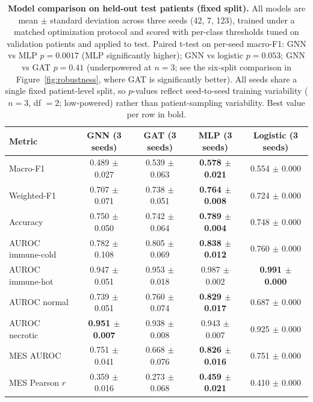 \documentclass[11pt,letterpaper]{article}
\begin{document}
\begin{table}[H]
\centering
\caption{\textbf{Model comparison on held-out test patients (fixed split).} All models are mean $\pm$ standard deviation across three seeds (42, 7, 123), trained under a matched optimization protocol and scored with per-class thresholds tuned on validation patients and applied to test. Paired t-test on per-seed macro-F1: GNN vs MLP $p=0.0017$ (MLP significantly higher); GNN vs logistic $p=0.053$; GNN vs GAT $p=0.41$ (underpowered at $n=3$; see the six-split comparison in Figure~\ref{fig:robustness}, where GAT is significantly better). All seeds share a single fixed patient-level split, so $p$-values reflect seed-to-seed training variability ($n=3$, df $=2$; low-powered) rather than patient-sampling variability. Best value per row in bold.}
\label{tab:comparison}
\small
\begin{tabular}{lcccc}
\toprule
\textbf{Metric} & \textbf{GNN (3 seeds)} & \textbf{GAT (3 seeds)} & \textbf{MLP (3 seeds)} & \textbf{Logistic (3 seeds)} \\
\midrule
Macro-F1            & 0.489 $\pm$ 0.027 & 0.539 $\pm$ 0.063 & \textbf{0.578 $\pm$ 0.021} & 0.554 $\pm$ 0.000 \\
Weighted-F1         & 0.707 $\pm$ 0.071 & 0.738 $\pm$ 0.051 & \textbf{0.764 $\pm$ 0.008} & 0.724 $\pm$ 0.000 \\
Accuracy            & 0.750 $\pm$ 0.050 & 0.742 $\pm$ 0.064 & \textbf{0.789 $\pm$ 0.004} & 0.748 $\pm$ 0.000 \\
AUROC immune-cold   & 0.782 $\pm$ 0.108 & 0.805 $\pm$ 0.069 & \textbf{0.838 $\pm$ 0.012} & 0.760 $\pm$ 0.000 \\
AUROC immune-hot    & 0.947 $\pm$ 0.051 & 0.953 $\pm$ 0.018 & 0.987 $\pm$ 0.002 & \textbf{0.991 $\pm$ 0.000} \\
AUROC normal        & 0.739 $\pm$ 0.051 & 0.760 $\pm$ 0.074 & \textbf{0.829 $\pm$ 0.017} & 0.687 $\pm$ 0.000 \\
AUROC necrotic      & \textbf{0.951 $\pm$ 0.007} & 0.938 $\pm$ 0.008 & 0.943 $\pm$ 0.007 & 0.925 $\pm$ 0.000 \\
MES AUROC           & 0.751 $\pm$ 0.041 & 0.668 $\pm$ 0.076 & \textbf{0.826 $\pm$ 0.016} & 0.751 $\pm$ 0.000 \\
MES Pearson $r$     & 0.359 $\pm$ 0.016 & 0.273 $\pm$ 0.068 & \textbf{0.459 $\pm$ 0.021} & 0.410 $\pm$ 0.000 \\
\bottomrule
\end{tabular}
\end{table}
\end{document}
